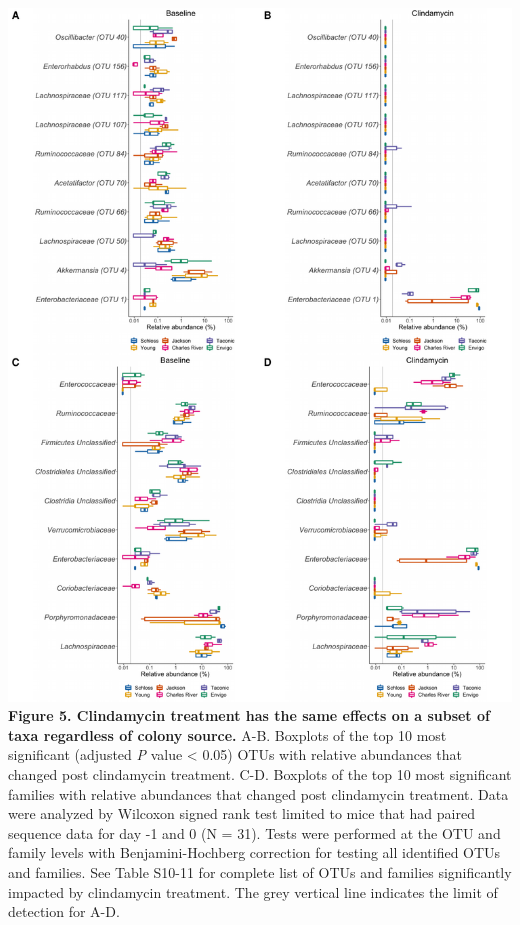 \documentclass[11pt,]{article}
\begin{document}
\includegraphics{figure_5.pdf} \textbf{Figure 5. Clindamycin treatment
has the same effects on a subset of taxa regardless of colony source.}
A-B. Boxplots of the top 10 most significant (adjusted \emph{P} value
\textless{} 0.05) OTUs with relative abundances that changed post
clindamycin treatment. C-D. Boxplots of the top 10 most significant
families with relative abundances that changed post clindamycin
treatment. Data were analyzed by Wilcoxon signed rank test limited to
mice that had paired sequence data for day -1 and 0 (N = 31). Tests were
performed at the OTU and family levels with Benjamini-Hochberg
correction for testing all identified OTUs and families. See Table
S10-11 for complete list of OTUs and families significantly impacted by
clindamycin treatment. The grey vertical line indicates the limit of
detection for A-D.

\newpage
\end{document}
